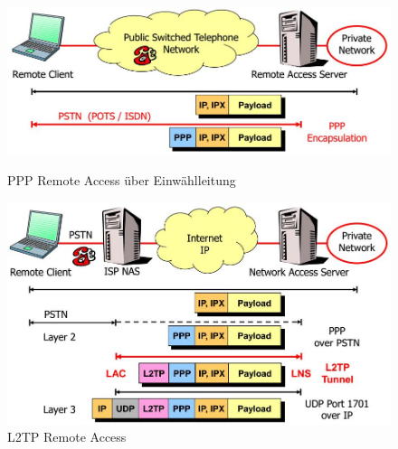 \begin{figure}[ht!]
	\centering
	\begin{minipage}[t]{0.4\textwidth}
		\centering
		\includegraphics[width=\linewidth]{images/ppp_remote_access}
		\caption{PPP Remote Access über Einwählleitung}
		\label{fig:pppremoteaccess}
	\end{minipage}
	\begin{minipage}[t]{0.4\textwidth}
		\centering
		\includegraphics[width=\linewidth]{images/l2tp_remote_access}
		\caption{L2TP Remote Access}
		\label{fig:l2tpremoteaccess}
	\end{minipage}
	

\end{figure}

